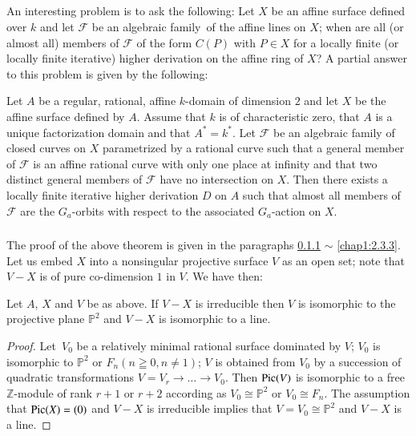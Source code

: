 \subsection{}\label{chap1:2.3}
An interesting problem is to ask the following: Let $X$ be an affine
surface defined over $k$ and let $\mathscr{F}$ be an algebraic 
family\pageoriginale\ of the affine lines on $X$; when are all (or
almost all) members of $\mathscr{F}$ of the form $C(P)$ with $P\in X$
for a locally finite (or locally finite iterative) higher derivation
on the affine ring of $X$? A partial answer to this problem is given
by the following:

\begin{theorem*}
Let $A$ be a regular, rational, affine $k$-domain of dimension $2$ and
let $X$ be the affine surface defined by $A$. Assume that $k$ is of
characteristic zero, that $A$ is a unique factorization domain and
that $A^{\ast}=k^{\ast}$. Let $\mathscr{F}$ be an algebraic family of
closed curves on $X$ parametrized by a rational curve such that a
general member of $\mathscr{F}$ is an affine rational curve with only
one place at infinity and that two distinct general members of
$\mathscr{F}$ have no intersection on $X$. Then there exists a locally
finite iterative higher derivation $D$ on $A$ such that almost all
members of $\mathscr{F}$ are the $G_{a}$-orbits with respect to the
associated $G_{a}$-action on $X$.
\end{theorem*}

\subsubsection{}\label{chap1:2.3.1}
The proof of the above theorem is given in the paragraphs
\ref{chap1:2.3.1} $\sim$ \ref{chap1:2.3.3}. Let us embed $X$ into a nonsingular
projective surface $V$ as an open set; note that $V-X$ is of pure
co-dimension $1$ in $V$. We have then:

\begin{lemma*}
Let $A$, $X$ and $V$ be as above. If $V-X$ is irreducible then $V$ is
isomorphic to the projective plane $\mathbb{P}^{2}$ and $V-X$ is
isomorphic to a line.
\end{lemma*}

\begin{proof}
Let\pageoriginale\ $V_{0}$ be a relatively minimal rational surface
dominated by $V$; $V_{0}$ is isomorphic to $\mathbb{P}^{2}$ or
$F_{n}(n\geqq 0,n\neq 1)$; $V$ is obtained from $V_{0}$ by a
succession of quadratic transformations $V=V_{r}\to \ldots \to
V_{0}$. Then $\operatorname{Pic}(V)$ is isomorphic to a free $\mathbb{Z}$-module of
rank $r+1$ or $r+2$ according as $V_{0}\cong \mathbb{P}^{2}$ or
$V_{0}\cong F_{n}$. The assumption that $\operatorname{Pic}(X)=(0)$ and $V-X$ is
irreducible implies that $V=V_{0}\cong \mathbb{P}^{2}$ and $V-X$ is a
line.
\end{proof}

